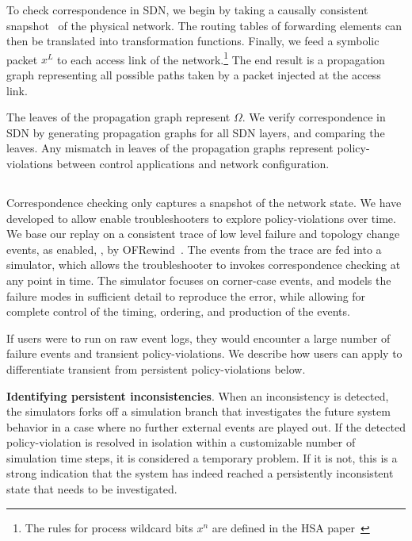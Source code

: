 To check correspondence in SDN, we begin by taking a causally consistent
snapshot~\cite{Chandy:1985:DSD:214451.214456} of the physical network. The routing
tables of forwarding elements can then be translated into transformation functions.
Finally, we feed a symbolic packet $x^L$ to each access link of the
network.\footnote{The rules for process wildcard bits $x^n$ are defined in
the HSA paper~\cite{hsa}} The end result is a propagation graph representing all possible paths taken by a packet injected
at the access link.

The leaves of the propagation graph represent $\Omega$. We
verify correspondence in SDN by generating propagation graphs for all SDN layers,
and comparing the leaves. Any mismatch in leaves of the propagation graphs
represent policy-violations between control applications and network
configuration.

\subsection{\SIMULATOR{}}

Correspondence checking only captures a snapshot of the network state.
We have developed \simulator{} to allow enable troubleshooters to explore
policy-violations over time. We base our replay on a consistent
trace of low level failure and topology change events, as enabled,
\eg{}, by OFRewind~\cite{ofrewind}. The
events from the trace are fed into a simulator, which allows the
troubleshooter to invokes correspondence
checking at any point in time. The simulator focuses on corner-case events,
and models the failure modes in sufficient detail to reproduce the error, while
allowing for complete control of the timing, ordering, and production of the events.


If users were to run \simulator{} on raw event logs, they would encounter a
large number of failure events and transient policy-violations. We describe
how users can apply \simulator{} to differentiate transient from persistent
policy-violations below.

\textbf{Identifying persistent inconsistencies}. When an inconsistency is detected,
the simulators forks off a simulation branch that investigates the future system behavior
in a case where no further external events are played out. If the detected
policy-violation
is resolved in isolation within a customizable number of simulation time steps, it is considered
a temporary problem. If it is not, this is a strong indication that the system has indeed
reached a persistently inconsistent state that needs to be investigated.


